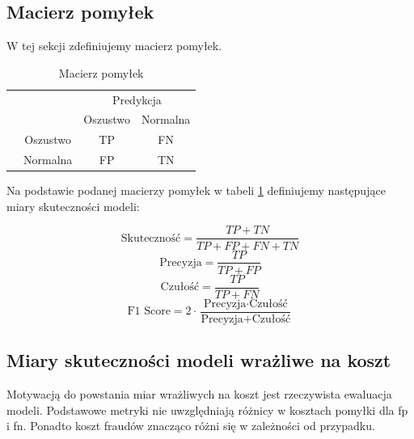 \documentclass{book}
\begin{document}
\subsection{Macierz pomyłek}

W tej sekcji zdefiniujemy macierz pomyłek.
\begin{table}[h]
	\begin{center}
		\makegapedcells
		\begin{tabular}{cc|cc}
			\multicolumn{2}{c}{}     &   \multicolumn{2}{c}{Predykcja} \\
			&            &   Oszustwo &   Normalna     \\ 
			\cline{2-4}
			\multirow{2}{*}{\rotatebox[origin=c]{90}{Prawda}} & Oszustwo   & TP         & FN              \\
			& Normalna   & FP         & TN              \\ 
			\cline{2-4}
		\end{tabular}
	\end{center}
	\caption{Macierz pomyłek}
	\label{macierz-pomylek}
\end{table}


Na podstawie podanej macierzy pomyłek w tabeli \ref{macierz-pomylek} definiujemy następujące miary skuteczności modeli:

$$ \text{Skuteczność} = \frac{TP + TN}{TP + FP + FN + TN} $$
$$ \text{Precyzja} = \frac{TP}{TP + FP} $$
$$ \text{Czułość}= \frac{TP}{TP + FN} $$
$$ \text{F1 Score} = 2 \cdot \frac{\text{Precyzja} \cdot \text{Czułość}}{\text{Precyzja} + \text{Czułość}} $$

\subsection{Miary skuteczności modeli wrażliwe na koszt}

	Motywacją do powstania miar wrażliwych na koszt jest rzeczywista ewaluacja modeli. Podstawowe metryki nie uwzględniają różnicy w kosztach pomyłki dla fp i fn. Ponadto koszt fraudów znacząco różni się w zależności od przypadku.
\end{document}
